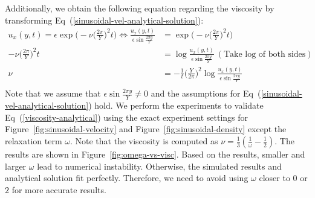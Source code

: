 Additionally, we obtain the following equation regarding the viscosity by
transforming Eq~(\ref{sinusoidal-vel-analytical-solution}):
\begin{equation}
  \begin{aligned}
    u_x(y, t) = \epsilon \exp
    \Biggl(
    -\nu
    \biggl(
      \frac{2\pi}{Y}
      \biggr)^2 t
    \Biggr) 
      \Longleftrightarrow 
    \frac{u_x(y, t)}{
      \epsilon
      \sin  \frac{2\pi y}{Y}
    }  &=  \exp
    \Biggl(
    -\nu
    \biggl(
      \frac{2\pi}{Y}
      \biggr)^2 t
    \Biggr) \\
    -\nu
    \biggl(
      \frac{2\pi}{Y}
      \biggr)^2 t
      &= 
    \log \frac{u_x(y, t)}{
      \epsilon
      \sin  \frac{2\pi y}{Y}
    }~(\text{Take log of both sides}) \\
    \nu
      &=
      - \frac{1}{t}
      \biggl(
        \frac{Y}{2\pi}
        \biggr)^2 
    \log \frac{u_x(y, t)}{
      \epsilon
      \sin  \frac{2\pi y}{Y}
    } \\
  \end{aligned}
  \label{viscosity-analytical}
\end{equation}
Note that we assume that $\epsilon\sin \frac{2\pi y}{Y} \neq 0$
and the assumptions for Eq~(\ref{sinusoidal-vel-analytical-solution}) hold.
We perform the experiments to validate Eq~(\ref{viscosity-analytical}) using 
the exact experiment settings for Figure~\ref{fig:sinusoidal-velocity} and Figure~\ref{fig:sinusoidal-density}
except the relaxation term $\omega$.
Note that the viscosity is computed as $\nu = \frac{1}{3} (\frac{1}{\omega} - \frac{1}{2})$.
The results are shown in Figure~\ref{fig:omega-vs-visc}.
Based on the results, smaller and larger $\omega$ lead to numerical instability.
Otherwise, the simulated results and analytical solution fit perfectly.
Therefore, we need to avoid using $\omega$ closer to $0$ or $2$ for more accurate results.

